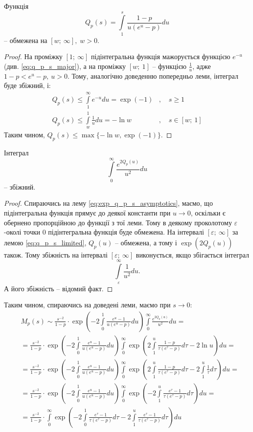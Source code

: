 \begin{lem}
	\label{eq:q_p_s_limited}
	Функція
	$$
	Q_p(s) = \int\limits_1^s \frac{1- p}{u(e^u - p)} du
	$$
	– обмежена на $[w; ~\infty], \; w>0$.
\end{lem}
\begin{proof}
	На проміжку $[1; ~\infty]$ підінтегральна функція мажорується функцією $e^{-u}$ (див. \eqref{eq:q_p_s_major}), а на проміжку $[w; ~1]$ – функцією $\frac{1}{u}$, адже $1- p < e^u - p, ~ u > 0$. Тому, аналогічно доведенню попередньо леми, інтеграл буде збіжний, і:
	\begin{align*}
	Q_p(s) \leq \int\limits_1^\infty e^{-u} du = \exp(-1) &,\quad s \geq 1 \\
	Q_p(s) \leq \int\limits_w^1 \frac{1}{u} du = - \ln w &, \quad s \in [w;~1]
	\end{align*}
	Таким чином, $Q_p(s) \leq \max\{-\ln w, \exp(-1)\}$.
\end{proof}

\begin{lem}
	Інтеграл
	$$
	\int\limits_0^\infty \frac{e^{2Q_p(u)}}{u^2} du
	$$
	– збіжний.
\end{lem}
\begin{proof}
	Спираючись на лему \eqref{eq:exp_q_p_s_asymptotics}, маємо, що підінтегральна функція прямує до деякої константи при $u \rightarrow 0$, оскільки є обернено пропорційною до функції з тої леми. Тому в деякому проколотому $\varepsilon$-околі точки 0 підінтегральна функція буде обмежена. На інтервалі $[\varepsilon; ~\infty]$ за лемою \eqref{eq:q_p_s_limited}, $Q_p(u)$ – обмежена, а тому і $\exp(2Q_p(u))$ також. Тому збіжність на інтервалі $[\varepsilon; ~\infty]$ виконується, якщо збігається інтеграл
	\[
	\int\limits_\varepsilon^\infty \frac{1}{u^2} du.
	\]
	А його збіжність – відомий факт.
\end{proof}

Таким чином, спираючись на доведені леми, маємо при $s \rightarrow 0$:
\begin{align*}
&M_p(s) \sim \frac{s^{-2}}{1-p} \cdot \exp\left(-2\int\limits_0^1 \frac{e^u  - 1}{u(e^u - p)} du\right) \int\limits_0^\infty \frac{e^{2Q_p(u)}}{u^2} du = \\
& = \frac{s^{-2}}{1-p} \cdot \exp\left(-2\int\limits_0^1 \frac{e^u  - 1}{u(e^u - p)} du\right) \int\limits_0^\infty \exp\left(2\int\limits_1^u \frac{1- p}{\tau(e^\tau - p)} d\tau - 2 \ln u\right) du = \\
& = \frac{s^{-2}}{1-p} \cdot \exp\left(-2\int\limits_0^1 \frac{e^u  - 1}{u(e^u - p)} du\right) \int\limits_0^\infty \exp\left(2\int\limits_1^u \frac{1- p}{\tau(e^\tau - p)} d\tau - 2  \int\limits_1^u  \frac{1}{\tau} d\tau \right) du = \\
& = \frac{s^{-2}}{1-p} \cdot \exp\left(-2\int\limits_0^1 \frac{e^u  - 1}{u(e^u - p)} du\right) \int\limits_0^\infty \exp\left(-2\int\limits_1^u \frac{e^{\tau} - 1}{\tau(e^\tau - p)} d\tau  \right) du = \\
& = \frac{s^{-2}}{1-p} \cdot \int\limits_0^\infty \exp\left( -2\int\limits_0^1 \frac{e^{\tau} - 1}{\tau(e^\tau - p)} d\tau -2\int\limits_1^u \frac{e^{\tau} - 1}{\tau(e^\tau - p)} d\tau  \right) du 
\end{align*}


